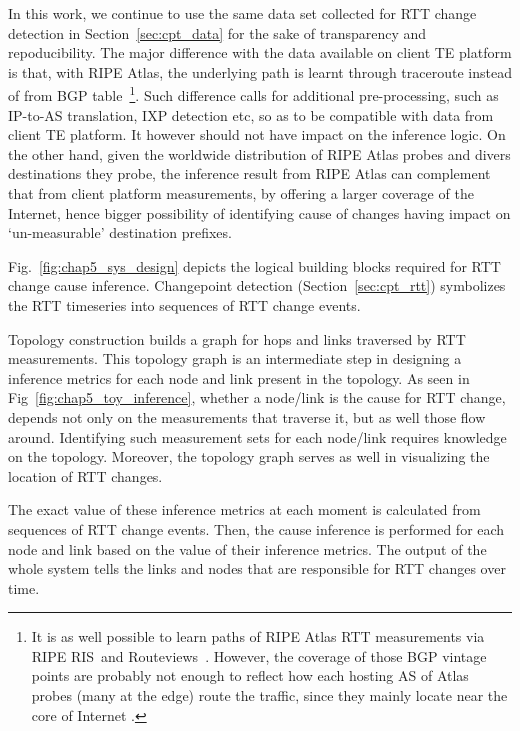 In this work, we continue to use the same data set collected for RTT change detection in Section~\ref{sec:cpt_data} for the sake of transparency and repoducibility. The major difference with the data available on client TE platform is that, with RIPE Atlas, the underlying path is learnt through traceroute instead of from BGP table~\footnote{It is as well possible to learn paths of RIPE Atlas RTT measurements via RIPE RIS~\cite{ris}and Routeviews~\cite{routeviews}. However, the coverage of those BGP vintage points are probably not enough to reflect how each hosting AS of Atlas probes (many at the edge) route the traffic, since they mainly locate near the core of Internet .}. 
Such difference calls for additional pre-processing, such as IP-to-AS translation, IXP detection etc, so as to be compatible with data from client TE platform. It however should not have impact on the inference logic. On the other hand, given the worldwide distribution of RIPE Atlas probes and divers destinations they probe, the inference result from RIPE Atlas can complement that from client platform measurements, by offering a larger coverage of the Internet, hence bigger possibility of identifying cause of changes having impact on `un-measurable' destination prefixes.

Fig.~\ref{fig:chap5_sys_design} depicts the logical building blocks required for RTT change cause inference. Changepoint detection (Section~\ref{sec:cpt_rtt}) symbolizes the RTT timeseries into sequences of RTT change events.

Topology construction builds a graph for hops and links traversed by RTT measurements.
This topology graph is an intermediate step in designing a inference metrics for each node and link present in the topology. As seen in Fig~\ref{fig:chap5_toy_inference}, whether a node/link is the cause for RTT change, depends not only on the measurements that traverse it, but as well those flow around. Identifying such measurement sets for each node/link requires knowledge on the topology. Moreover, the topology graph serves as well in visualizing the location of RTT changes. 

The exact value of these inference metrics at each moment is calculated from sequences of RTT change events. Then, the cause inference is performed for each node and link based on the value of their inference metrics.
The output of the whole system tells the links and nodes that are responsible for RTT changes over time.

